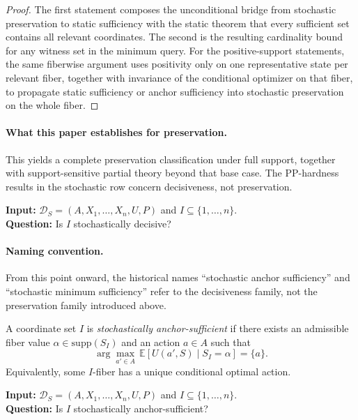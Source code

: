 \begin{proof}
The first statement composes the unconditional bridge from stochastic preservation to static sufficiency with the static theorem that every sufficient set contains all relevant coordinates. The second is the resulting cardinality bound for any witness set in the minimum query. For the positive-support statements, the same fiberwise argument uses positivity only on one representative state per relevant fiber, together with invariance of the conditional optimizer on that fiber, to propagate static sufficiency or anchor sufficiency into stochastic preservation on the whole fiber.
\end{proof}

\paragraph{What this paper establishes for preservation.}
This yields a complete preservation classification under full support, together with support-sensitive partial theory beyond that base case. The PP-hardness results in the stochastic row concern decisiveness, not preservation.

\begin{problem}\label{prob:stochastic-singleton-sufficiency}
\textbf{Input:} $\mathcal{D}_S=(A,X_1,\ldots,X_n,U,P)$ and $I\subseteq\{1,\ldots,n\}$. \\
\textbf{Question:} Is $I$ stochastically decisive?
\end{problem}

\paragraph{Naming convention.}
From this point onward, the historical names ``stochastic anchor sufficiency'' and ``stochastic minimum sufficiency'' refer to the decisiveness family, not the preservation family introduced above.

\begin{definition}\label{def:stochastic-anchor-sufficient}
A coordinate set $I$ is \emph{stochastically anchor-sufficient} if there exists an admissible fiber value $\alpha \in \mathrm{supp}(S_I)$ and an action $a \in A$ such that
\[
\arg\max_{a'\in A}\,\mathbb{E}[U(a',S)\mid S_I = \alpha] = \{a\}.
\]
Equivalently, some $I$-fiber has a unique conditional optimal action.
\end{definition}

\begin{problem}\label{prob:stochastic-anchor-sufficiency}
\textbf{Input:} $\mathcal{D}_S=(A,X_1,\ldots,X_n,U,P)$ and $I\subseteq\{1,\ldots,n\}$. \\
\textbf{Question:} Is $I$ stochastically anchor-sufficient?
\end{problem}

